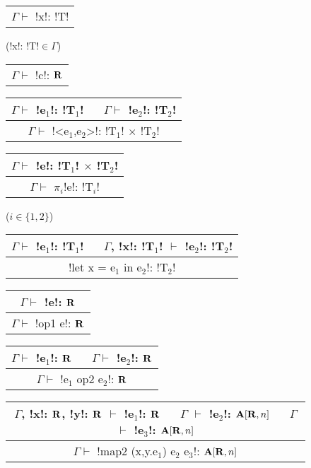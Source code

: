 \begin{figure*}[tb]
    \centering
    \begin{tabular}{c} 
    \\\hline
    $\Gamma \vdash$ !x!: !T!
    \end{tabular}(!x!: !T!$\in\Gamma$)
    \hspace{0.5cm}
    \begin{tabular}{c} 
        \\\hline
        $\Gamma \vdash$ !c!: $\mathbf{R}$
    \end{tabular}
    \hspace{0.5cm}
    \begin{tabular}{c}
    $\Gamma \vdash$ !e$_1$!: !T$_1$! $\quad$ $\Gamma \vdash$ !e$_2$!: !T$_2$! \\\hline  
    $\Gamma \vdash$ !<e$_1$,e$_2$>!: !T$_1$! $\times$ !T$_2$!
    \end{tabular}
    \hspace{0.5cm}
    \begin{tabular}{c}
        $\Gamma \vdash$ !e!: !T$_1$! $\times$ !T$_2$! \\\hline  
        $\Gamma \vdash$ $\pi_i$!e!: !T$_i$!
    \end{tabular}($i\in\{1,2\}$)

    \begin{tabular}{c}
    $\Gamma \vdash$ !e$_1$!: !T$_1$! $\quad$ $\Gamma$, !x!: !T$_1$! $\vdash$ !e$_2$!: !T$_2$! \\\hline
    !let x = e$_1$ in e$_2$!: !T$_2$!
    \end{tabular}
    \hspace{0.5cm}
    \begin{tabular}{c}
        $\Gamma \vdash$ !e!: $\mathbf{R}$ \\\hline  
        $\Gamma \vdash$ !op1 e!: $\mathbf{R}$
    \end{tabular}
    \hspace{0.5cm}
    \begin{tabular}{c}
        $\Gamma \vdash$ !e$_1$!: $\mathbf{R}$ $\quad$ $\Gamma \vdash$ !e$_2$!: $\mathbf{R}$ \\\hline  
        $\Gamma \vdash$ !e$_1$ op2 e$_2$!: $\mathbf{R}$
        \end{tabular}
 
    \begin{tabular}{c}
        $\Gamma$, !x!: $\mathbf{R}$, !y!: $\mathbf{R}$ $\vdash$ !e$_1$!: $\mathbf{R}$ 
        $\quad$ $\Gamma$ $\vdash$ !e$_2$!: $\mathbf{A}[\mathbf{R},n]$
        $\quad$ $\Gamma$ $\vdash$ !e$_3$!: $\mathbf{A}[\mathbf{R},n]$
        \\\hline  
        $\Gamma \vdash$ !map2 (x,y.e$_1$) e$_2$ e$_3$!: $\mathbf{A}[\mathbf{R},n]$
    \end{tabular}


\end{figure*}
